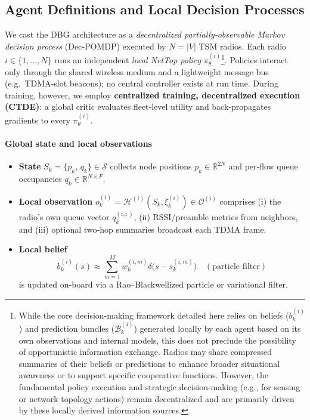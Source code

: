 \documentclass[doc.tex]{subfiles}
\begin{document}
\subsection{Agent Definitions and Local Decision Processes}
\label{sec:agent_defs}

We cast the DBG architecture as a \emph{decentralized partially‑observable Markov decision process} (Dec‑POMDP) executed by
$N=|V|$ TSM radios. Each radio $i\!\in\!\{1,\dots,N\}$ runs an independent \textit{local NetTop policy} $\pi_\theta^{(i)}$\footnote{While the core decision-making framework detailed here relies on beliefs ($b_k^{(i)}$) and prediction bundles ($\mathcal{B}_k^{(i)}$) generated locally by each agent based on its own observations and internal models, this does not preclude the possibility of opportunistic information exchange. Radios may share compressed summaries of their beliefs or predictions to enhance broader situational awareness or to support specific cooperative functions. However, the fundamental policy execution and strategic decision-making (e.g., for sensing or network topology actions) remain decentralized and are primarily driven by these locally derived information sources.}. Policies interact only through the shared wireless medium and a lightweight message bus (e.g.\ TDMA‑slot beacons); no central controller exists at run time. During training, however, we employ \textbf{centralized training, decentralized execution (CTDE)}: a global critic evaluates fleet‑level utility and back‑propagates gradients to every $\pi_\theta^{(i)}$.

\vspace{0.4em}
\paragraph{Global state and local observations}

\begin{itemize}
  \item \textbf{State}\;
        $S_k=\{p_k,\,q_k\}\in\mathcal{S}$ collects node positions
        $p_k\!\in\!\mathbb{R}^{2N}$ and per‑flow queue occupancies
        $q_k\!\in\!\mathbb{R}^{N\times F}$.
  \item \textbf{Local observation}\;
        $o_k^{(i)}=\mathcal{H}^{(i)}(S_k,\xi_k^{(i)})\in\mathcal{O}^{(i)}$
        comprises (i) the radio’s own queue vector $q_k^{(i,:)}$,
        (ii) RSSI/preamble metrics from neighbors, and
        (iii) optional two‑hop summaries broadcast each TDMA frame.
  \item \textbf{Local belief}\;
        \[
          b_k^{(i)}(s)\approx\sum_{m=1}^{M}w_k^{(i,m)}\delta\!\bigl(s-s_k^{(i,m)}\bigr)\quad(\text{particle filter})
        \]
        is updated on‑board via a Rao–Blackwellized particle or variational filter.
\end{itemize}
\end{document}

